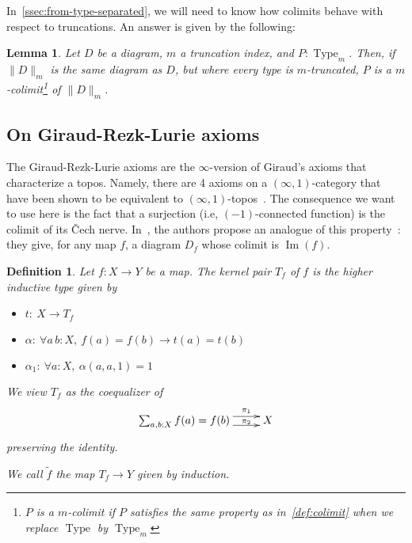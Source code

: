 \documentclass[preprint,9pt,numbers]{sigplanconf}
\makeatletter
\newtheorem{defi}[thm]{Definition}
\newtheorem{lem}[thm]{Lemma}
\newcommand{\ie}{i.e,\xspace}
\def\dar[#1]#2{\ar@<-#2>[#1]\ar@<#2>[#1]} %
\DeclareMathOperator{\Type}{Type}
\DeclareMathOperator{\im}{Im}
\newcommand \colim[1] {\mathrm{colim}(Q)}
\newenvironment{mymath}[1][-0em]{%
  \newcommand\mymathaux{\vspace{#1}}%
  \vspace{#1}%
  \begin{equation*}%
  }{ %
    \mymathaux%
  \end{equation*}}
\makeatother
\begin{document}
In~\ref{ssec:from-type-separated}, we will need to know how colimits
behave with respect to truncations. An answer is given by the following:

\begin{lem}
  Let $D$ be a diagram, $m$ a truncation index, and
  $P:\Type_{m}$. 
  Then, if $\|D\|_m$ is the same diagram as $D$, but where every type
  is $m$-truncated, $P$ is a $m$-colimit\footnote{$P$ is a $m$-colimit
    if $P$ satisfies the same property as in~\ref{def:colimit} when
    we replace $\Type$ by $\Type_m$} of $\|D\|_m$.
\end{lem}



\subsection{On Giraud-Rezk-Lurie axioms}
\label{sec:giraud-ax}

The Giraud-Rezk-Lurie axioms are the $\infty$-version of Giraud's
axioms that characterize a topos. Namely, there are 4 axioms on a
$(\infty,1)$-category that have been shown to be equivalent to
$(\infty,1)$-topos~\cite[Chapter 6]{lurie}.
%
The consequence we want to use here is the fact that a surjection
(\ie{} $(-1)$-connected function) is the colimit of its \v{C}ech
nerve.
%
In~\cite{boulier}, the authors propose an analogue of this property~:
they give, for any map $f$, a diagram $D_f$ whose colimit is $\im(f)$.

\begin{defi}
  Let $f:X \to Y$ be a map. The kernel pair $T_f$ of $f$ is the higher inductive type given
  by
  \begin{itemize}
  \item $t:~X \to T_f$
  \item $\alpha:~\forall a\,b:X,~f(a) = f(b) \to t(a) = t(b)$
  \item $\alpha_1:~\forall a:X,~\alpha(a, a, 1) = 1$
  \end{itemize}
  We view $T_f$ as the coequalizer of
  \begin{mymath}\xymatrix{
    \sum_{a,b:X} f(a) = f(b) \dar[r]{4pt}^-{\pi_1}_-{\pi_2} & X
  }\end{mymath}%
  preserving the identity.

  We call $\tilde f$ the map $T_f \to Y$ given by induction.
\end{defi}
\end{document}
